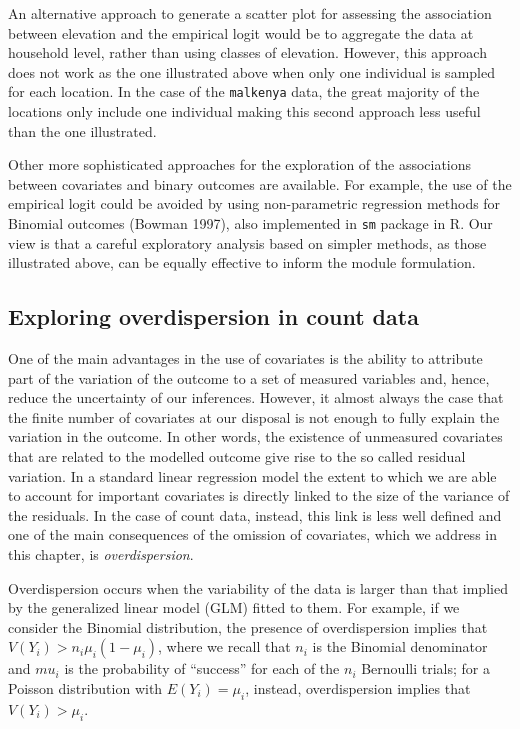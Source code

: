 \documentclass[
  letterpaper,
]{krantz}
\begin{document}
An alternative approach to generate a scatter plot for assessing the
association between elevation and the empirical logit would be to
aggregate the data at household level, rather than using classes of
elevation. However, this approach does not work as the one illustrated
above when only one individual is sampled for each location. In the case
of the \texttt{malkenya} data, the great majority of the locations only
include one individual making this second approach less useful than the
one illustrated.

Other more sophisticated approaches for the exploration of the
associations between covariates and binary outcomes are available. For
example, the use of the empirical logit could be avoided by using
non-parametric regression methods for Binomial outcomes (Bowman 1997),
also implemented in \texttt{sm} package in R. Our view is that a careful
exploratory analysis based on simpler methods, as those illustrated
above, can be equally effective to inform the module formulation.

\hypertarget{sec-overdispersion}{%
\subsection{Exploring overdispersion in count
data}\label{sec-overdispersion}}

One of the main advantages in the use of covariates is the ability to
attribute part of the variation of the outcome to a set of measured
variables and, hence, reduce the uncertainty of our inferences. However,
it almost always the case that the finite number of covariates at our
disposal is not enough to fully explain the variation in the outcome. In
other words, the existence of unmeasured covariates that are related to
the modelled outcome give rise to the so called residual variation. In a
standard linear regression model the extent to which we are able to
account for important covariates is directly linked to the size of the
variance of the residuals. In the case of count data, instead, this link
is less well defined and one of the main consequences of the omission of
covariates, which we address in this chapter, is \emph{overdispersion}.

Overdispersion occurs when the variability of the data is larger than
that implied by the generalized linear model (GLM) fitted to them. For
example, if we consider the Binomial distribution, the presence of
overdispersion implies that \(V(Y_i) > n_i \mu_{i}(1-\mu_i)\), where we
recall that \(n_i\) is the Binomial denominator and \(mu_i\) is the
probability of ``success'' for each of the \(n_i\) Bernoulli trials; for
a Poisson distribution with \(E(Y_i) = \mu_i\), instead, overdispersion
implies that \(V(Y_i) > \mu_{i}\).
\end{document}
